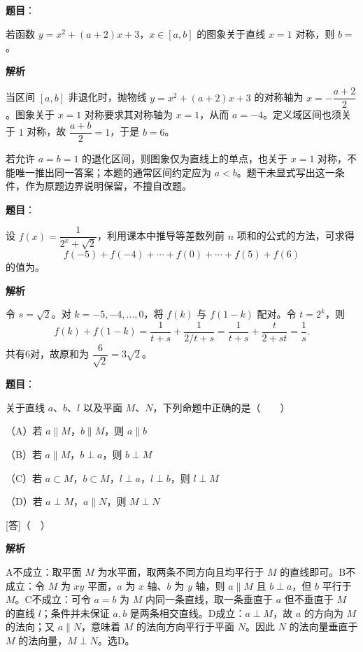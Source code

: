 \begin{answer}

\textbf{题目}：

若函数 $y=x^2+(a+2)x+3$，$x\in[a,b]$ 的图象关于直线 $x=1$ 对称，则 $b=$\underline{\qquad}。

\textbf{解析}

当区间 $[a,b]$ 非退化时，抛物线 $y=x^2+(a+2)x+3$ 的对称轴为 $x=-\dfrac{a+2}{2}$。图象关于 $x=1$ 对称要求其对称轴为 $x=1$，从而 $a=-4$。定义域区间也须关于 $1$ 对称，故 $\dfrac{a+b}{2}=1$，于是 $b=6$。

若允许 $a=b=1$ 的退化区间，则图象仅为直线上的单点，也关于 $x=1$ 对称，不能唯一推出同一答案；本题的通常区间约定应为 $a<b$。题干未显式写出这一条件，作为原题边界说明保留，不擅自改题。


\end{answer}
\begin{answer}

\textbf{题目}：

设 $f(x)=\dfrac{1}{2^x+\sqrt2}$，利用课本中推导等差数列前 $n$ 项和的公式的方法，可求得
\nopagebreak[4]
\[
f(-5)+f(-4)+\cdots+f(0)+\cdots+f(5)+f(6)
\]
的值为\underline{\qquad}。

\textbf{解析}

令 $s=\sqrt2$。对 $k=-5,-4,\ldots,0$，将 $f(k)$ 与 $f(1-k)$ 配对。令 $t=2^k$，则
\nopagebreak[4]
\[
f(k)+f(1-k)=\frac1{t+s}+\frac1{2/t+s}
=\frac1{t+s}+\frac{t}{2+st}
=\frac1s.
\]
共有6对，故原和为 $\dfrac6{\sqrt2}=3\sqrt2$。


\end{answer}
\begin{answer}

\textbf{题目}：

关于直线 $a$、$b$、$l$ 以及平面 $M$、$N$，下列命题中正确的是\mbox{（　　）}

（A）若 $a\parallel M$，$b\parallel M$，则 $a\parallel b$

（B）若 $a\parallel M$，$b\perp a$，则 $b\perp M$

（C）若 $a\subset M$，$b\subset M$，$l\perp a$，$l\perp b$，则 $l\perp M$

（D）若 $a\perp M$，$a\parallel N$，则 $M\perp N$

[答]（　）

\textbf{解析}

A不成立：取平面 $M$ 为水平面，取两条不同方向且均平行于 $M$ 的直线即可。B不成立：令 $M$ 为 $xy$ 平面，$a$ 为 $x$ 轴、$b$ 为 $y$ 轴，则 $a\parallel M$ 且 $b\perp a$，但 $b$ 平行于 $M$。C不成立：可令 $a=b$ 为 $M$ 内同一条直线，取一条垂直于 $a$ 但不垂直于 $M$ 的直线 $l$；条件并未保证 $a,b$ 是两条相交直线。D成立：$a\perp M$，故 $a$ 的方向为 $M$ 的法向；又 $a\parallel N$，意味着 $M$ 的法向方向平行于平面 $N$。因此 $N$ 的法向量垂直于 $M$ 的法向量，$M\perp N$。选D。


\end{answer}
